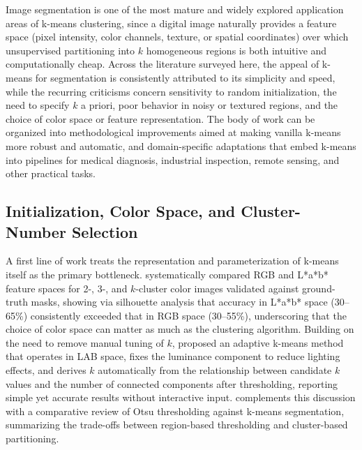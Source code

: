 Image segmentation is one of the most mature and widely explored application areas of k-means clustering, since a digital image naturally provides a feature space (pixel intensity, color channels, texture, or spatial coordinates) over which unsupervised partitioning into $k$ homogeneous regions is both intuitive and computationally cheap. Across the literature surveyed here, the appeal of k-means for segmentation is consistently attributed to its simplicity and speed, while the recurring criticisms concern sensitivity to random initialization, the need to specify $k$ a priori, poor behavior in noisy or textured regions, and the choice of color space or feature representation. The body of work can be organized into methodological improvements aimed at making vanilla k-means more robust and automatic, and domain-specific adaptations that embed k-means into pipelines for medical diagnosis, industrial inspection, remote sensing, and other practical tasks.

\subsection{Initialization, Color Space, and Cluster-Number Selection}
A first line of work treats the representation and parameterization of k-means itself as the primary bottleneck. \cite{maqilburney2014means} systematically compared RGB and L*a*b* feature spaces for 2-, 3-, and $k$-cluster color images validated against ground-truth masks, showing via silhouette analysis that accuracy in L*a*b* space (30--65\%) consistently exceeded that in RGB space (30--55\%), underscoring that the choice of color space can matter as much as the clustering algorithm. Building on the need to remove manual tuning of $k$, \cite{zheng2018image} proposed an adaptive k-means method that operates in LAB space, fixes the luminance component to reduce lighting effects, and derives $k$ automatically from the relationship between candidate $k$ values and the number of connected components after thresholding, reporting simple yet accurate results without interactive input. \cite{kumar2019comparative} complements this discussion with a comparative review of Otsu thresholding against k-means segmentation, summarizing the trade-offs between region-based thresholding and cluster-based partitioning.

